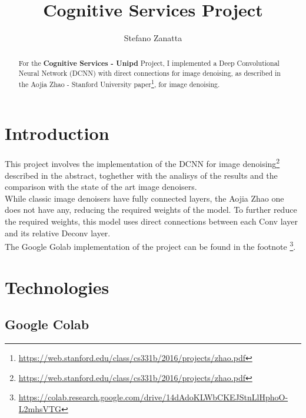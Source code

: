 \documentclass[twocolumn,showpacs,%
  nofootinbib,aps,superscriptaddress,%
  eqsecnum,prd,notitlepage,showkeys,10pt]{revtex4-1}
\begin{document}
\title{Cognitive Services Project}
\author{Stefano Zanatta}

\begin{abstract}
For the \textbf{Cognitive Services - Unipd} Project, I implemented a Deep Convolutional Neural Network (DCNN) with direct connections for image denoising, as described in the Aojia Zhao - Stanford University paper\footnote{\url{https://web.stanford.edu/class/cs331b/2016/projects/zhao.pdf}}, for image denoising.
\end{abstract}

\maketitle

\section{Introduction}
\label{sec:introduction}
This project involves the implementation of the DCNN for image denoising\footnote{\url{https://web.stanford.edu/class/cs331b/2016/projects/zhao.pdf}} described in the abstract, toghether with the analisys of the results and the comparison with the state of the art image denoisers.\\
While classic image denoisers have fully connected layers, the Aojia Zhao one does not have any, reducing the required weights of the model. To further reduce the required weights, this model uses direct connections between each Conv layer and its relative Deconv layer.\\
The Google Golab implementation of the project can be found in the footnote \footnote{\url{https://colab.research.google.com/drive/14dAdoKLWbCKEJStnLlHphoO-L2mhsVTG}}.

\section{Technologies}
\label{sec:technologies}

\subsection{Google Colab}
\label{subsec:colab}
\end{document}
